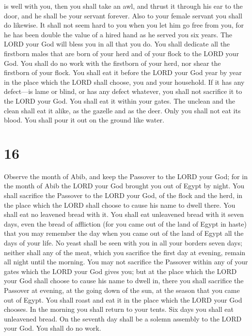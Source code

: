 is well with you,  then you shall take an awl, and thrust
it through his ear to the door, and he shall be your servant forever.
Also to your female servant you shall do likewise.  It
shall not seem hard to you when you let him go free from you, for he has
been double the value of a hired hand as he served you six years. The
LORD your God will bless you in all that you do.  You shall
dedicate all the firstborn males that are born of your herd and of your
flock to the LORD your God. You shall do no work with the firstborn of
your herd, nor shear the firstborn of your flock.  You
shall eat it before the LORD your God year by year in the place which
the LORD shall choose, you and your household.  If it has
any defect---is lame or blind, or has any defect whatever, you shall not
sacrifice it to the LORD your God.  You shall eat it within
your gates. The unclean and the clean shall eat it alike, as the gazelle
and as the deer.  Only you shall not eat its blood. You
shall pour it out on the ground like water.

\hypertarget{section-15}{%
\section{16}\label{section-15}}

 Observe the month of Abib, and keep the Passover to the
LORD your God; for in the month of Abib the LORD your God brought you
out of Egypt by night.  You shall sacrifice the Passover to
the LORD your God, of the flock and the herd, in the place which the
LORD shall choose to cause his name to dwell there.  You
shall eat no leavened bread with it. You shall eat unleavened bread with
it seven days, even the bread of affliction (for you came out of the
land of Egypt in haste) that you may remember the day when you came out
of the land of Egypt all the days of your life.  No yeast
shall be seen with you in all your borders seven days; neither shall any
of the meat, which you sacrifice the first day at evening, remain all
night until the morning.  You may not sacrifice the Passover
within any of your gates which the LORD your God gives you; 
but at the place which the LORD your God shall choose to cause his name
to dwell in, there you shall sacrifice the Passover at evening, at the
going down of the sun, at the season that you came out of Egypt.
 You shall roast and eat it in the place which the LORD your
God chooses. In the morning you shall return to your tents. 
Six days you shall eat unleavened bread. On the seventh day shall be a
solemn assembly to the LORD your God. You shall do no work.

